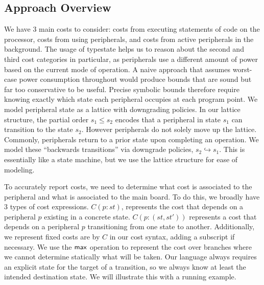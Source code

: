 \documentclass[sigconf, nonacm, screen]{acmart}
\begin{document}
\subsection{Approach Overview}
We have 3 main costs to consider: costs from executing statements of code on the processor, costs from using peripherals, and costs from active peripherals in the background. The usage of typestate helps us to reason about the second and third cost categories in particular, as peripherals use a different amount of power based on the current mode of operation. A naive approach that assumes worst-case power consumption throughout would produce bounds that are sound but far too conservative to be useful. Precise symbolic bounds therefore require knowing exactly which state each peripheral occupies at each program point. We model peripheral state as a lattice with downgrading policies. In our lattice structure, the partial order $s_1 \leq s_2$ encodes that a peripheral in state $s_1$ can transition to the state $s_2$. However peripherals do not solely move up the lattice. Commonly, peripherals return to a prior state upon completing an operation. We model these ``backwards transitions'' via downgrade policies, $s_2 \hookrightarrow s_1$. This is essentially like a state machine, but we use the lattice structure for ease of modeling. 

To accurately report costs, we need to determine what cost is associated to the peripheral and what is associated to the main board. To do this, we broadly have 3 types of cost expressions. $C(p: st)$, represents the cost that depends on a peripheral $p$ existing in a concrete state. $C(p: (st, st'))$ represents a cost that depends on a peripheral $p$  transitioning from one state to another. Additionally, we represent fixed costs are by $C$ in our cost syntax, adding a subscript if necessary. We use the $\mathsf{max}$ operation to represent the cost over branches where we cannot determine statically what will be taken. Our language always requires an explicit state for the target of a transition, so we always know at least the intended destination state. We will illustrate this with a running example.
\end{document}

